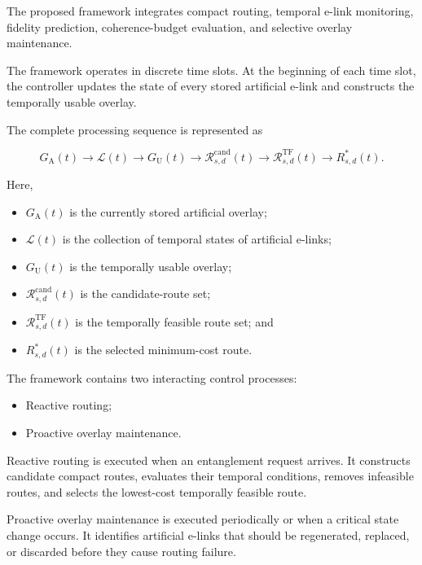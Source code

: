 The proposed framework integrates compact routing, temporal e-link monitoring, fidelity prediction, coherence-budget evaluation, and selective overlay maintenance.

The framework operates in discrete time slots. At the beginning of each time slot, the controller updates the state of every stored artificial e-link and constructs the temporally usable overlay.

The complete processing sequence is represented as

\begin{equation}
    G_{\mathrm{A}}(t)
    \rightarrow
    \mathcal{L}(t)
    \rightarrow
    G_{\mathrm{U}}(t)
    \rightarrow
    \mathcal{R}_{s,d}^{\mathrm{cand}}(t)
    \rightarrow
    \mathcal{R}_{s,d}^{\mathrm{TF}}(t)
    \rightarrow
    R_{s,d}^{*}(t).
\end{equation}

Here,

\begin{itemize}
    \item $G_{\mathrm{A}}(t)$ is the currently stored artificial overlay;
    \item $\mathcal{L}(t)$ is the collection of temporal states of artificial e-links;
    \item $G_{\mathrm{U}}(t)$ is the temporally usable overlay;
    \item $\mathcal{R}_{s,d}^{\mathrm{cand}}(t)$ is the candidate-route set;
    \item $\mathcal{R}_{s,d}^{\mathrm{TF}}(t)$ is the temporally feasible route set; and
    \item $R_{s,d}^{*}(t)$ is the selected minimum-cost route.
\end{itemize}

The framework contains two interacting control processes:

\begin{itemize}
    \item Reactive routing;
    \item Proactive overlay maintenance.
\end{itemize}

Reactive routing is executed when an entanglement request arrives. It constructs candidate compact routes, evaluates their temporal conditions, removes infeasible routes, and selects the lowest-cost temporally feasible route.

Proactive overlay maintenance is executed periodically or when a critical state change occurs. It identifies artificial e-links that should be regenerated, replaced, or discarded before they cause routing failure.

